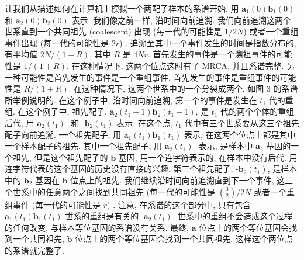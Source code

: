 \documentclass[
    12pt,%
    ]{article}
\begin{document}
让我们从描述如何在计算机上模拟一个两配子样本的系谱开始, 用 $\mathbf{a}_{1}(0)\mathbf{b}_{1}(0)$ 和
$\mathbf{a}_{2}(0)\mathbf{b}_{2}(0)$ 表示. 我们像之前一样, 沿时间向前追溯. 我们向前追溯这两个世系直到一个共同祖先
(coalescent) 出现 (每一代的可能性是 $1/2N$) 或者一个重组事件出现 (每一代的可能性是 $2r$) .
追溯至其中一个事件发生的时间是指数分布的, 有平均值 $2N/(1+R)$, 其中 $R$ 是 $4Nr$.
首先发生的事件是一个溯祖事件的可能性是 $1/(1+R)$. 在这种情况下, 这两个位点这时有了 MRCA, 并且系谱完整.
另一种可能性是首先发生的事件是一个重组事件. 首先发生的事件是重组事件的可能性是 $R/(1+R)$. 在这种情况下,
这两个世系中的一个分裂成两个, 如图 3 的系谱所举例说明的. 在这个例子中, 沿时间向前追溯, 第一个的事件是发生在 $t_{1}$
代的重组. 在这个例子中, 祖先配子, $\mathbf{a}_{2}(t_{1}-1)\mathbf{b}_{2}(t_{1}-1)$, 是 $t_{1}$
代的两个个体的重组后代, 用 $\mathbf{a}_{2}(t_{1})\text{-}$ 和 $\text{-}\mathbf{b}_{2}(t_{1})$ 表示.
在这个点, $t_{1}$ 代中有三个世系要从这三个祖先配子向前追溯. 一个祖先配子, 用
$\mathbf{a}_{1}(t_{1})\mathbf{b}_{1}(t_{1})$ 表示, 在这两个位点上都是其中一个样本配子的祖先. 其中一个祖先配子,
用 $\mathbf{a}_{2}(t_{1})\text{-}$ 表示, 是样本中 $\mathbf{a}_{2}$ 基因的一个祖先, 但是这个祖先配子的
$\mathbf{b}$ 基因, 用一个连字符表示的, 在样本中没有后代. 用连字符代表的这个基因的历史没有直接的兴趣. 第三个祖先配子,
$\text{-}\mathbf{b}_{2}(t_{1})$, 是样本中的 $\mathbf{b}_{2}$ 基因在 $\mathbf{b}$ 位点上的祖先.
我们继续沿时间向前追溯直到下一个事件, 这三个世系中的任意两个之间找到共同祖先 (每一代的可能性是 $\binom{3}{2}/2N$
或者一个重组事件 (每一代的可能性是 $r$) . 注意, 在系谱的这个部分中, 只有包含
$\mathbf{a}_{1}(t_{1})\mathbf{b}_{1}(t_{1})$ 世系的重组是有关的. $\mathbf{a}_{2}(t_{1})\text{-}$
世系中的重组不会造成这个过程的任何改变, 与样本等位基因的系谱没有关系. 最终, $\mathbf{a}$
位点上的两个等位基因会找到一个共同祖先, $\mathbf{b}$ 位点上的两个等位基因会找到一个共同祖先,
这样这个两位点的系谱就完整了.
\end{document}
